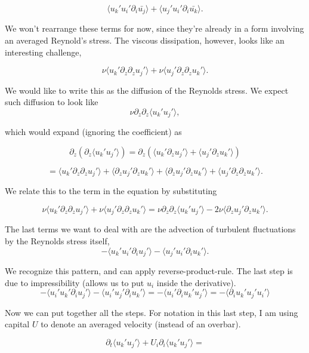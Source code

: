 \documentclass[
  letterpaper,
  DIV=11,
  numbers=noendperiod]{scrartcl}
\begin{document}
\[    \langle u_k' u_i' \partial_i \bar{u_j} \rangle 
    + \langle u_j' u_i' \partial_i \bar{u_k} \rangle. \]

We won't rearrange these terms for now, since they're already in a form
involving an averaged Reynold's stress. The viscous dissipation,
however, looks like an interesting challenge,

\[ \nu  \langle u_k' \partial_z \partial_z u_j' \rangle  
   +  \nu \langle u_j' \partial_z \partial_z u_k' \rangle. \]

We would like to write this as the diffusion of the Reynolds stress. We
expect such diffusion to look like
\[ \nu \partial_z \partial_z \langle  u_k'  u_j' \rangle ,\]

which would expand (ignoring the coefficient) as

\[ \partial_z \left( \partial_z \langle  u_k'  u_j' \rangle \right) = \partial_z  ( \langle u_k' \partial_z  u_j' \rangle + \langle u_j' \partial_z u_k' \rangle) \]

\[ =  \langle u_k' \partial_z \partial_z u_j' \rangle + \langle \partial_z u_j'\partial_z u_k' \rangle +  \langle \partial_z u_j'\partial_z u_k' \rangle + \langle u_j' \partial_z  \partial_z u_k' \rangle.\]

We relate this to the term in the equation by substituting

\[ \nu  \langle u_k' \partial_z \partial_z u_j' \rangle  
+  \nu \langle u_j' \partial_z \partial_z u_k' \rangle =  \nu \partial_z \partial_z \langle  u_k'  u_j' \rangle - 2 \nu \langle \partial_z u_j'\partial_z u_k' \rangle.
\]

The last terms we want to deal with are the advection of turbulent
fluctuations by the Reynolds stress itself,
\[  -  \langle u_k' u_i' \partial_i u_j' \rangle  
  - \langle u_j' u_i' \partial_i u_k' \rangle . \]

We recognize this pattern, and can apply reverse-product-rule. The last
step is due to impressibility (allows us to put \(u_i\) inside the
derivative).\\
\[  -  \langle u_i' u_k'  \partial_i u_j' \rangle  
  - \langle u_i' u_j' \partial_i u_k' \rangle =  -  \langle u_i' \partial_i u_k' u_j' \rangle  = -  \langle  \partial_i u_k' u_j' u_i' \rangle \]

Now we can put together all the steps. For notation in this last step, I
am using capital \(U\) to denote an averaged velocity (instead of an
overbar).

\begin{equation}
    \partial_t \langle u_k' u_j' \rangle  + U_i \partial_i \langle u_k' u_j' \rangle= 
\end{equation}
\end{document}
